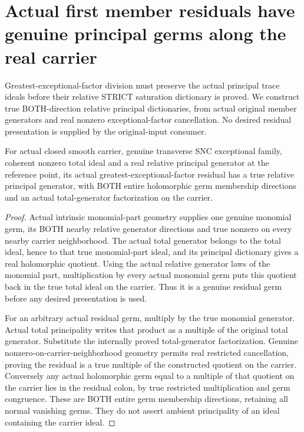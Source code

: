 \section{Actual first member residuals have genuine principal germs along the real carrier}

Greatest-exceptional-factor division must preserve the actual principal trace
ideals before their relative STRICT saturation dictionary is proved. We
construct true BOTH-direction relative principal dictionaries, from actual
original member generators and real nonzero exceptional-factor cancellation.
No desired residual presentation is supplied by the original-input consumer.

\begin{lemma}
\label{hir:sharp-actual-relative-principal-total-gives-residual-principal}
\leanok
For actual closed smooth carrier, genuine transverse SNC exceptional family,
coherent nonzero total ideal and a real relative principal generator at the
reference point, its actual greatest-exceptional-factor residual has a true
relative principal generator, with BOTH entire holomorphic germ membership
directions and an actual total-generator factorization on the carrier.
\end{lemma}
\begin{proof}
Actual intrinsic monomial-part geometry supplies one genuine monomial germ,
its BOTH nearby relative generator directions and true nonzero on every
nearby carrier neighborhood. The actual total generator belongs to the total
ideal, hence to that true monomial-part ideal, and its principal dictionary
gives a real holomorphic quotient. Using the actual relative generator laws
of the monomial part, multiplication by every actual monomial germ puts this
quotient back in the true total ideal on the carrier. Thus it is a genuine
residual germ before any desired presentation is used.

For an arbitrary actual residual germ, multiply by the true monomial generator.
Actual total principality writes that product as a multiple of the original
total generator. Substitute the internally proved total-generator factorization.
Genuine nonzero-on-carrier-neighborhood geometry permits real restricted
cancellation, proving the residual is a true multiple of the constructed
quotient on the carrier. Conversely any actual holomorphic germ equal to a
multiple of that quotient on the carrier lies in the residual colon, by true
restricted multiplication and germ congruence. These are BOTH entire germ
membership directions, retaining all normal vanishing germs. They do not
assert ambient principality of an ideal containing the carrier ideal.
\end{proof}

